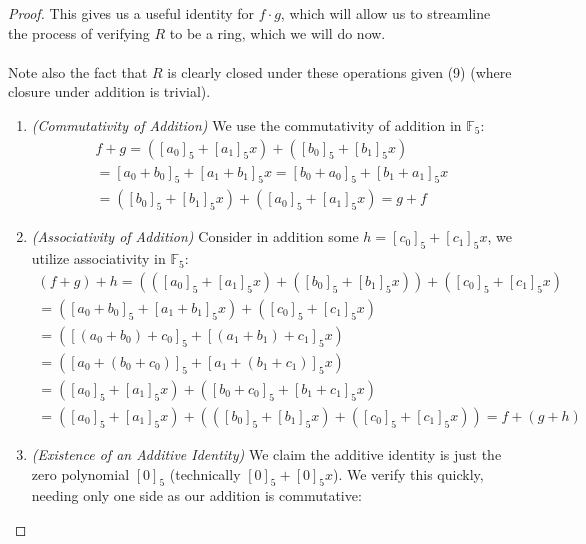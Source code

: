 \documentclass[12pt]{article}
\newenvironment{ex}[2][Exercise]{\begin{trivlist}
\item[\hskip \labelsep {\bfseries #1}\hskip \labelsep {\bfseries #2.}]}{\end{trivlist}}
\begin{document}
\begin{ex}{2}
\begin{enumerate}[label=(\alph*)]
\begin{proof}
            This gives us a useful identity for $f \cdot g$, which will allow us to streamline the process of verifying $R$ to be a ring, which we will do now. \\ \\ Note also the fact that $R$ is clearly closed under these operations given (9) (where closure under addition is trivial).
            \begin{enumerate}
                \item \textit{(Commutativity of Addition)} We use the commutativity of addition in $\mathbb{F}_5$:
                \begin{equation}
                    \begin{aligned}
                        f + g = ([a_0]_5 + [a_1]_5x) + ([b_0]_5 + [b_1]_5x) \\
                        = [a_0 + b_0]_5 + [a_1 + b_1]_5x = [b_0 + a_0]_5 + [b_1 + a_1]_5x \\
                        = ([b_0]_5 + [b_1]_5x) + ([a_0]_5 + [a_1]_5x) = g + f
                    \end{aligned}
                \end{equation}
                \item \textit{(Associativity of Addition)} Consider in addition some $h = [c_0]_5 + [c_1]_5x$, we utilize associativity in $\mathbb{F}_5$:
                \begin{equation}
                    \begin{aligned}
                    (f + g) + h = (([a_0]_5 + [a_1]_5x) + ([b_0]_5 + [b_1]_5x)) + ([c_0]_5 + [c_1]_5x) \\
                    = ([a_0 + b_0]_5 + [a_1 + b_1]_5x) + ([c_0]_5 + [c_1]_5x) \\ = 
                    ([(a_0 + b_0) + c_0]_5 + [(a_1 + b_1) + c_1]_5x) \\ =
                    ([a_0 + (b_0 + c_0)]_5 + [a_1 + (b_1 + c_1)]_5x)\\ 
                    = ([a_0]_5 + [a_1]_5x) + ([b_0 + c_0]_5 + [b_1 + c_1]_5x) \\ = ([a_0]_5 + [a_1]_5x) + (([b_0]_5 + [b_1]_5x) + ([c_0]_5 + [c_1]_5x)) = f + (g + h)
                    \end{aligned}
                \end{equation}
                \item \textit{(Existence of an Additive Identity)} We claim the additive identity is just the zero polynomial $[0]_5$ (technically $[0]_5 + [0]_5x$). We verify this quickly, needing only one side as our addition is commutative:

\end{enumerate}
\end{proof}
\end{enumerate}
\end{ex}
\end{document}
